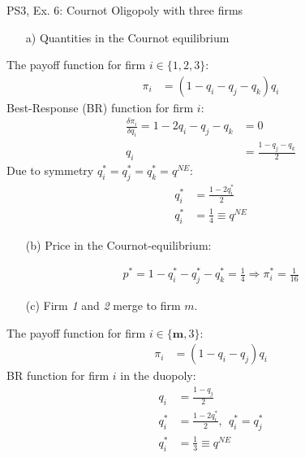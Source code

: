 \begin{frame}{PS3, Ex. 6: Cournot Oligopoly with three firms}
  \begin{multicols}{2}
    \begin{itemize}
      \item[a)] Quantities in the Cournot equilibrium
    \end{itemize}
    The payoff function for firm $i\in\{1,2,3\}$:
    \begin{align*}
        \pi_i&=(1-q_i-q_j-q_k)q_i
    \end{align*}
    Best-Response (BR) function for firm $i$:
    \begin{align*}
        \frac{\delta\pi_i}{\delta q_i}=1-2q_i-q_j-q_k&=0\\
                                                  q_i&=\frac{1-q_j-q_k}{2}
    \end{align*}
    Due to symmetry $q_i^{*}=q_j^{*}=q_k^{*}=q^{NE}$:
    \begin{align*}
        q_i^{*} &= \frac{1-2q_i^{*}}{2}\\
        q_i^{*} &= \frac{1}{4}\equiv q^{NE}
    \end{align*}
    \begin{itemize}
      \item[(b)] Price in the Cournot-equilibrium:
    \end{itemize}
    \begin{align*}
      p^{*}=1-q_i^{*}-q_j^{*}-q_k^{*}=\frac{1}{4}\Rightarrow\pi_i^{*}=\frac{1}{16}
    \end{align*}
  \vfill\null \columnbreak
    \begin{itemize}
      \item[(c)] Firm \textit{1} and \textit{2} merge to firm $m$.
    \end{itemize}
    The payoff function for firm $i\in\{\bm{m},3\}$:
    \begin{align*}
        \pi_i&=(1-q_i-q_j)q_i
    \end{align*}
    BR function for firm $i$ in the duopoly:
    \begin{align*}
        q_i&=\frac{1-q_j}{2}\\
        q_i^{*} &= \frac{1-2q_i^{*}}{2},\ \ q_i^{*}=q_j^{*}\\
        q_i^{*} &= \frac{1}{3}\equiv q^{NE}
    \end{align*}
  \vfill\null
  \end{multicols}
\end{frame}
